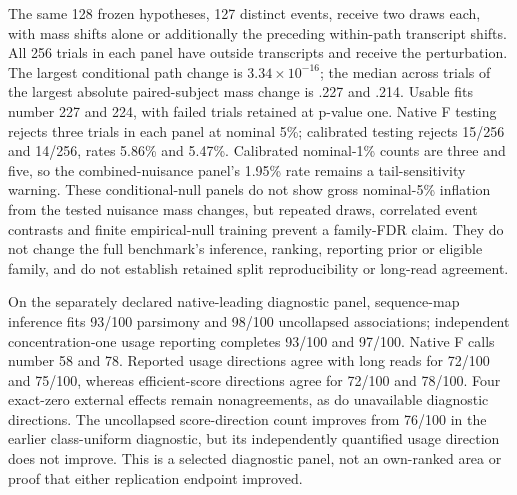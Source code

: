 \documentclass[11pt]{article}
\begin{document}
The same 128 frozen hypotheses, 127 distinct events, receive two draws each, with mass shifts alone or additionally the preceding within-path transcript shifts. All 256 trials in each panel have outside transcripts and receive the perturbation. The largest conditional path change is \(3.34\times10^{-16}\); the median across trials of the largest absolute paired-subject mass change is .227 and .214. Usable fits number 227 and 224, with failed trials retained at p-value one. Native F testing rejects three trials in each panel at nominal 5\%; calibrated testing rejects 15/256 and 14/256, rates 5.86\% and 5.47\%. Calibrated nominal-1\% counts are three and five, so the combined-nuisance panel's 1.95\% rate remains a tail-sensitivity warning. These conditional-null panels do not show gross nominal-5\% inflation from the tested nuisance mass changes, but repeated draws, correlated event contrasts and finite empirical-null training prevent a family-FDR claim. They do not change the full benchmark's inference, ranking, reporting prior or eligible family, and do not establish retained split reproducibility or long-read agreement.

On the separately declared native-leading diagnostic panel, sequence-map inference fits 93/100 parsimony and 98/100 uncollapsed associations; independent concentration-one usage reporting completes 93/100 and 97/100. Native F calls number 58 and 78. Reported usage directions agree with long reads for 72/100 and 75/100, whereas efficient-score directions agree for 72/100 and 78/100. Four exact-zero external effects remain nonagreements, as do unavailable diagnostic directions. The uncollapsed score-direction count improves from 76/100 in the earlier class-uniform diagnostic, but its independently quantified usage direction does not improve. This is a selected diagnostic panel, not an own-ranked area or proof that either replication endpoint improved.
\end{document}
